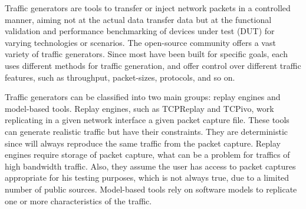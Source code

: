 Traffic generators are tools to transfer or inject network packets in a controlled manner,  aiming not at the actual data transfer data but at the functional validation and performance benchmarking of devices under test (\acrshort{DUT}) for varying technologies or scenarios. The open-source community offers a vast variety of traffic generators. Since most have been built for specific goals,  each uses different methods for traffic generation, and offer control over different traffic features, such as throughput, packet-sizes, protocols, and so on\cite{ditg-paper}. 

Traffic generators can be classified into two main groups: replay engines\cite{sourcesonoff-paper} and model-based tools. Replay engines, such as TCPReplay and TCPivo\cite{tcpivo-paper}, work replicating in a given network interface a given packet capture file. These tools can generate realistic traffic but have their constraints. They are deterministic since will always reproduce the same traffic from the packet capture. Replay engines require storage of packet capture, what can be a problem for traffics of high bandwidth traffic. Also, they assume the user has access to packet captures appropriate for his testing purposes, which is not always true, due to a limited number of public sources. Model-based tools rely on software models to replicate one or more characteristics of the traffic. 


